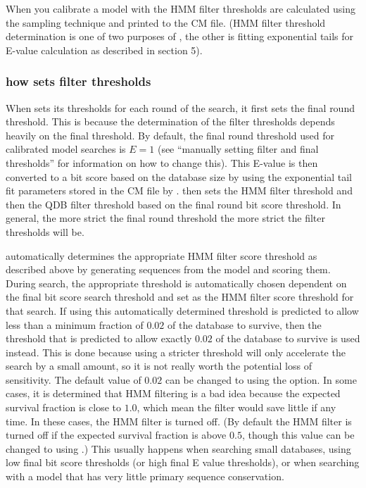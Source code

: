 When you calibrate a model with  the HMM filter
thresholds are calculated using the sampling technique and printed to
the CM file. (HMM filter threshold determination is one of two
purposes of , the other is fitting exponential tails
for E-value calculation as described in section 5).

\subsubsection{how  sets filter thresholds}
When  sets its thresholds for each round of the
search, it first sets the final round threshold. This is because the
determination of the filter thresholds depends heavily on the final
threshold. By default, the final round threshold used for calibrated
model searches is $E=1$ (see ``manually setting filter and final
thresholds'' for information on how to change this). 
This E-value is then converted to a bit score based on the database
size by using the exponential tail fit parameters stored in the CM
file by .  then sets the HMM filter
threshold and then the QDB filter threshold based on the final round
bit score threshold. In general, the more strict the final round
threshold the more strict the filter thresholds will be. 

 automatically determines the appropriate HMM filter
score threshold as described above by generating sequences from the
model and scoring them.  During search, the appropriate threshold is
automatically chosen dependent on the final bit score search threshold
and set as the HMM filter score threshold for that search.
If using this automatically determined threshold is predicted to allow
less than a minimum fraction of $0.02$ of the database to survive, then the
threshold that is predicted to allow exactly $0.02$ of the database to
survive is used instead. This is done because using a stricter
threshold will only accelerate the search by a small amount, so it is
not really worth the potential loss of sensitivity. 
The default value of $0.02$ can be changed to  using the 
 option.
In some cases, it is determined that HMM filtering is a
bad idea because the expected survival fraction is close to $1.0$,
which mean the filter would save little if any time. In these cases,
the HMM filter is turned off. (By default the HMM filter is turned off
if the expected survival fraction is above $0.5$, though this value
can be changed to  using .)
This usually happens when searching
small databases, using low final bit score thresholds (or high final E
value thresholds), or when searching with a model that has very little
primary sequence conservation.

